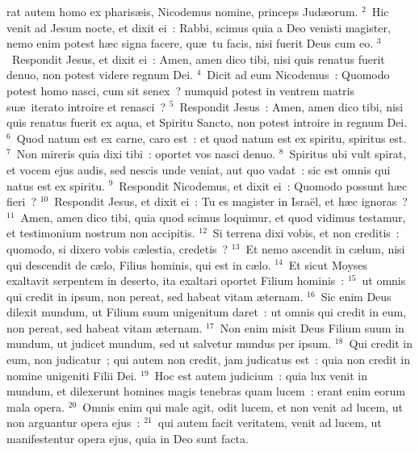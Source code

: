\bchapter
{}rat autem homo ex pharis\ae is, Nicodemus nomine, princeps Jud\ae orum.
${}^{2}$~Hic venit ad Jesum nocte, et dixit ei~: Rabbi, scimus quia a Deo venisti magister, nemo enim potest h\ae c signa facere, qu\ae\ tu facis, nisi fuerit Deus cum eo.
${}^{3}$~Respondit Jesus, et dixit ei~: Amen, amen dico tibi, nisi quis renatus fuerit denuo, non potest videre regnum Dei.
${}^{4}$~Dicit ad eum Nicodemus~: Quomodo potest homo nasci, cum sit senex~? numquid potest in ventrem matris su\ae\ iterato introire et renasci~?
${}^{5}$~Respondit Jesus~: Amen, amen dico tibi, nisi quis renatus fuerit ex aqua, et Spiritu Sancto, non potest introire in regnum Dei.
${}^{6}$~Quod natum est ex carne, caro est~: et quod natum est ex spiritu, spiritus est.
${}^{7}$~Non mireris quia dixi tibi~: oportet vos nasci denuo.
${}^{8}$~Spiritus ubi vult spirat, et vocem ejus audis, sed nescis unde veniat, aut quo vadat~: sic est omnis qui natus est ex spiritu.
${}^{9}$~Respondit Nicodemus, et dixit ei~: Quomodo possunt h\ae c fieri~?
${}^{10}$~Respondit Jesus, et dixit ei~: Tu es magister in Isra\"el, et h\ae c ignoras~?
${}^{11}$~Amen, amen dico tibi, quia quod scimus loquimur, et quod vidimus testamur, et testimonium nostrum non accipitis.
${}^{12}$~Si terrena dixi vobis, et non creditis~: quomodo, si dixero vobis c\ae lestia, credetis~?
${}^{13}$~Et nemo ascendit in c\ae lum, nisi qui descendit de c\ae lo, Filius hominis, qui est in c\ae lo.
${}^{14}$~Et sicut Moyses exaltavit serpentem in deserto, ita exaltari oportet Filium hominis~:
${}^{15}$~ut omnis qui credit in ipsum, non pereat, sed habeat vitam \ae ternam.
${}^{16}$~Sic enim Deus dilexit mundum, ut Filium suum unigenitum daret~: ut omnis qui credit in eum, non pereat, sed habeat vitam \ae ternam.
${}^{17}$~Non enim misit Deus Filium suum in mundum, ut judicet mundum, sed ut salvetur mundus per ipsum.
${}^{18}$~Qui credit in eum, non judicatur~; qui autem non credit, jam judicatus est~: quia non credit in nomine unigeniti Filii Dei.
${}^{19}$~Hoc est autem judicium~: quia lux venit in mundum, et dilexerunt homines magis tenebras quam lucem~: erant enim eorum mala opera.
${}^{20}$~Omnis enim qui male agit, odit lucem, et non venit ad lucem, ut non arguantur opera ejus~:
${}^{21}$~qui autem facit veritatem, venit ad lucem, ut manifestentur opera ejus, quia in Deo sunt facta.


